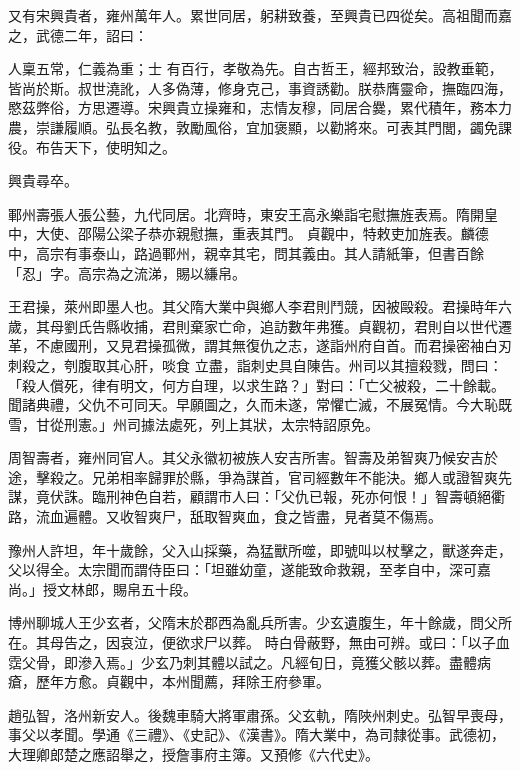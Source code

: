 \begin{pinyinscope}
 又有宋興貴者，雍州萬年人。累世同居，躬耕致養，至興貴已四從矣。高祖聞而嘉之，武德二年，詔曰：



 人稟五常，仁義為重；士
 有百行，孝敬為先。自古哲王，經邦致治，設教垂範，皆尚於斯。叔世澆訛，人多偽薄，修身克己，事資誘勸。朕恭膺靈命，撫臨四海，愍茲弊俗，方思遷導。宋興貴立操雍和，志情友穆，同居合爨，累代積年，務本力農，崇謙履順。弘長名教，敦勵風俗，宜加褒顯，以勸將來。可表其門閭，蠲免課役。布告天下，使明知之。



 興貴尋卒。



 鄆州壽張人張公藝，九代同居。北齊時，東安王高永樂詣宅慰撫旌表焉。隋開皇中，大使、邵陽公梁子恭亦親慰撫，重表其門。
 貞觀中，特敕吏加旌表。麟德中，高宗有事泰山，路過鄆州，親幸其宅，問其義由。其人請紙筆，但書百餘「忍」字。高宗為之流涕，賜以縑帛。



 王君操，萊州即墨人也。其父隋大業中與鄉人李君則鬥競，因被毆殺。君操時年六歲，其母劉氏告縣收捕，君則棄家亡命，追訪數年弗獲。貞觀初，君則自以世代遷革，不慮國刑，又見君操孤微，謂其無復仇之志，遂詣州府自首。而君操密袖白刃刺殺之，刳腹取其心肝，啖食
 立盡，詣刺史具自陳告。州司以其擅殺戮，問曰：「殺人償死，律有明文，何方自理，以求生路？」對曰：「亡父被殺，二十餘載。聞諸典禮，父仇不可同天。早願圖之，久而未遂，常懼亡滅，不展冤情。今大恥既雪，甘從刑憲。」州司據法處死，列上其狀，太宗特詔原免。



 周智壽者，雍州同官人。其父永徽初被族人安吉所害。智壽及弟智爽乃候安吉於途，擊殺之。兄弟相率歸罪於縣，爭為謀首，官司經數年不能決。鄉人或證智爽先
 謀，竟伏誅。臨刑神色自若，顧謂市人曰：「父仇已報，死亦何恨！」智壽頓絕衢路，流血遍體。又收智爽尸，舐取智爽血，食之皆盡，見者莫不傷焉。



 豫州人許坦，年十歲餘，父入山採藥，為猛獸所噬，即號叫以杖擊之，獸遂奔走，父以得全。太宗聞而謂侍臣曰：「坦雖幼童，遂能致命救親，至孝自中，深可嘉尚。」授文林郎，賜帛五十段。



 博州聊城人王少玄者，父隋末於郡西為亂兵所害。少玄遺腹生，年十餘歲，問父所在。其母告之，因哀泣，便欲求尸以葬。
 時白骨蔽野，無由可辨。或曰：「以子血霑父骨，即滲入焉。」少玄乃刺其體以試之。凡經旬日，竟獲父骸以葬。盡體病瘡，歷年方愈。貞觀中，本州聞薦，拜除王府參軍。



 趙弘智，洛州新安人。後魏車騎大將軍肅孫。父玄軌，隋陜州刺史。弘智早喪母，事父以孝聞。學通《三禮》、《史記》、《漢書》。隋大業中，為司隸從事。武德初，大理卿郎楚之應詔舉之，授詹事府主簿。又預修《六代史》。




\end{pinyinscope}
